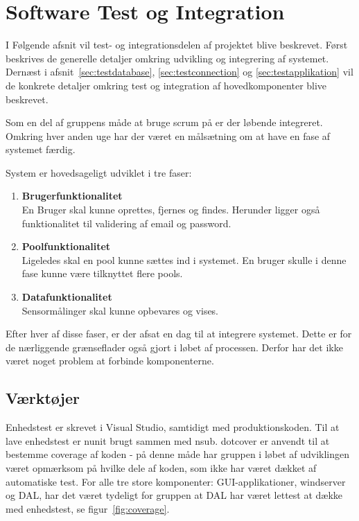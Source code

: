 \chapter{Software Test og Integration}

I Følgende afsnit vil test- og integrationsdelen af projektet blive beskrevet. Først beskrives de generelle detaljer omkring udvikling og integrering af systemet. 
Dernæst i afsnit~\ref{sec:testdatabase}, \ref{sec:testconnection} og \ref{sec:testapplikation} vil de konkrete detaljer omkring test og integration af hovedkomponenter blive beskrevet.

Som en del af gruppens måde at bruge scrum på er der løbende integreret. Omkring hver anden uge har der været en målsætning om at have en fase af systemet færdig. 

System er hovedsageligt udviklet i tre faser: 

\begin{enumerate}
	\item \textbf{Brugerfunktionalitet}\\
	En Bruger skal kunne oprettes, fjernes og findes. Herunder ligger også funktionalitet til validering af email og password. 
	\item \textbf{Poolfunktionalitet}\\
	Ligeledes skal en pool kunne sættes ind i systemet. En bruger skulle i denne fase kunne være tilknyttet flere pools.
	\item \textbf{Datafunktionalitet}\\
	Sensormålinger skal kunne opbevares og vises. 
\end{enumerate}

Efter hver af disse faser, er der afsat en dag til at integrere systemet. Dette er for de nærliggende grænseflader også gjort i løbet af processen. Derfor har det ikke været noget problem at forbinde komponenterne. 

\section{Værktøjer}
Enhedstest er skrevet i Visual Studio, samtidigt med produktionskoden. Til at lave enhedstest er \gls{nunit} brugt sammen med \gls{nsub}. 
\gls{dotcover} er anvendt til at bestemme coverage af koden - på denne måde har gruppen i løbet af udviklingen været opmærksom på hvilke dele af koden, som ikke har været dækket af automatiske test.
For alle tre store komponenter: GUI-applikationer, \gls{windserver} og DAL, har det været tydeligt for gruppen at DAL har været lettest at dække med enhedstest, se figur~\ref{fig:coverage}.

